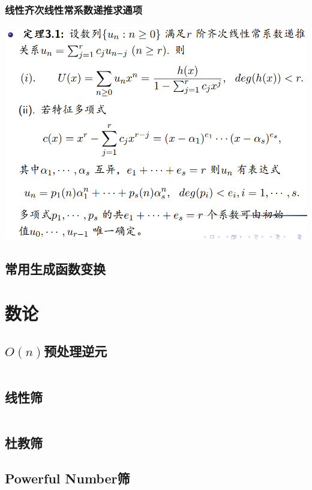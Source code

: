 \documentclass[a4paper, twoside]{article}
\begin{document}
\begin{multicols}{2}
				\subsubsection{线性齐次线性常系数递推求通项}
					\includegraphics[scale = 0.265]{../src/math/线性齐次线性常系数递推.png}
			
			\subsection{常用生成函数变换}
				

		\newpage
		\section{数论}

			\subsection{$O(n)$预处理逆元}
				\inputminted{cpp}{../src/numbertheory/O(n)求逆元.cpp}

			\subsection{线性筛}
				\inputminted{cpp}{../src/numbertheory/扩展线性筛.cpp}

			\subsection{杜教筛}
				
			
			\subsection{Powerful Number筛}
				


\end{multicols}
\end{document}
